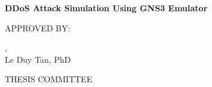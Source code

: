\begin{center}

\Large
\textbf{DDoS Attack Simulation Using GNS3 Emulator}


\vspace{3cm}

\large
APPROVED BY:\\
\vspace{1cm}

\underline{\hspace{5cm}},\\
Le Duy Tan, PhD\\
\vspace{1cm}




\vspace{3cm}

THESIS COMMITTEE
    
\end{center}







\pagebreak